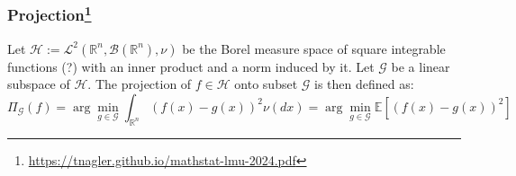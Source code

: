\subsubsection*{Projection\footnote{\href{https://tnagler.github.io/mathstat-lmu-2024.pdf}{https://tnagler.github.io/mathstat-lmu-2024.pdf}}}
Let $\mathcal{H} := \mathcal{L}^2(\mathbb{R}^n, \mathcal{B}(\mathbb{R}^n),\nu)$ be the Borel measure space of square integrable functions (?) with an inner product and a norm induced by it. Let $\mathcal{G}$ be a linear subspace of $\mathcal{H}$. The projection of $f \in \mathcal{H}$ onto subset $\mathcal{G}$ is then defined as:
\[
\Pi_{\mathcal{G}}(f) = \arg\min_{g \in \mathcal{G}} \int_{\mathbb{R}^n} \left( f(x) - g(x) \right)^2 \nu(dx) = \arg\min_{g \in \mathcal{G}} \mathbb{E}[(f(x) - g(x))^2]
\]
